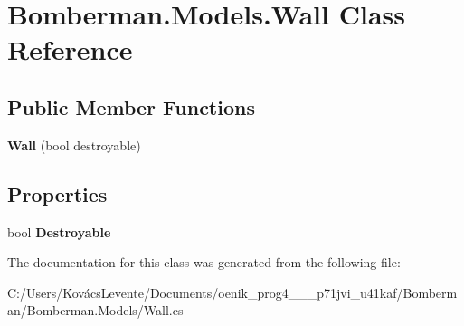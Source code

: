 \hypertarget{class_bomberman_1_1_models_1_1_wall}{}\section{Bomberman.\+Models.\+Wall Class Reference}
\label{class_bomberman_1_1_models_1_1_wall}
\subsection*{Public Member Functions}
\begin{DoxyCompactItemize}
\item 
\mbox{\label{class_bomberman_1_1_models_1_1_wall_ab34ac211696ce61f4a3f2bc48707791a}} 
{\bfseries Wall} (bool destroyable)
\end{DoxyCompactItemize}
\subsection*{Properties}
\begin{DoxyCompactItemize}
\item 
\mbox{\label{class_bomberman_1_1_models_1_1_wall_acf3f4f2aadfe49d8823cec12369b46e5}} 
bool {\bfseries Destroyable}
\end{DoxyCompactItemize}


The documentation for this class was generated from the following file\+:\begin{DoxyCompactItemize}
\item 
C\+:/\+Users/\+Kovács\+Levente/\+Documents/oenik\+\_\+prog4\+\_\+\_\+\_\+p71jvi\+\_\+u41kaf/\+Bomberman/\+Bomberman.\+Models/Wall.\+cs\end{DoxyCompactItemize}
